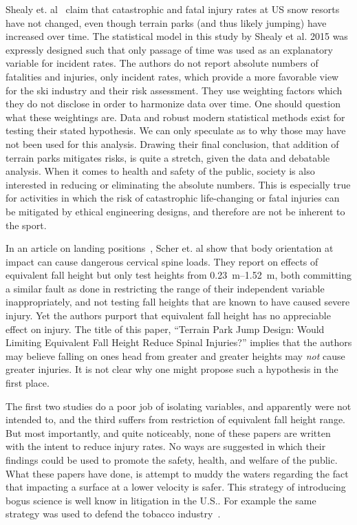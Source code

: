 \documentclass{article}
\begin{document}
Shealy et. al~\cite{Shealy2015} claim that catastrophic and fatal injury rates
at US snow resorts have not changed, even though terrain parks (and thus likely
jumping) have increased over time. The statistical model in this study by
Shealy et al. 2015 was expressly designed such that only passage of time was
used as an explanatory variable for incident rates. The authors do not report
absolute numbers of fatalities and injuries, only incident rates, which provide
a more favorable view for the ski industry and their risk assessment. They use
weighting factors which they do not disclose in order to harmonize data over
time. One should question what these weightings are.  Data and robust modern
statistical methods exist for testing their stated hypothesis. We can only
speculate as to why those may have not been used for this analysis. Drawing
their final conclusion, that addition of terrain parks mitigates risks, is
quite a stretch, given the data and debatable analysis. When it comes to health
and safety of the public, society is also interested in reducing or eliminating
the absolute numbers. This is especially true for activities in which the risk
of catastrophic life-changing or fatal injuries can be mitigated by ethical
engineering designs, and therefore are not be inherent to the sport.

In an article on landing positions~\cite{Scher2015}, Scher et. al show that
body orientation at impact can cause dangerous cervical spine loads. They
report on effects of equivalent fall height but only test heights from
\SIrange{0.23}{1.52}{\meter}, both committing a similar fault as done in
\cite{Shealy2010} restricting the range of their independent variable
inappropriately, and not testing fall heights that are known to have caused
severe injury. Yet the authors purport that equivalent fall height has no
appreciable effect on injury. The title of this paper, ``Terrain Park Jump
Design: Would Limiting Equivalent Fall Height Reduce Spinal Injuries?'' implies
that the authors may believe falling on ones head from greater and greater
heights may \emph{not} cause greater injuries. It is not clear why one might
propose such a hypothesis in the first place.

The first two studies do a poor job of isolating variables, and apparently were
not intended to, and the third suffers from restriction of equivalent fall
height range. But most importantly, and quite noticeably, none of these papers
are written with the intent to reduce injury rates. No ways are suggested in
which their findings could be used to promote the safety, health, and welfare
of the public. What these papers have done, is attempt to muddy the waters
regarding the fact that impacting a surface at a lower velocity is safer. This
strategy of introducing bogus science is well know in litigation in the U.S..
For example the same strategy was used to defend the tobacco
industry~\cite{Oreskes2010}.
\end{document}
